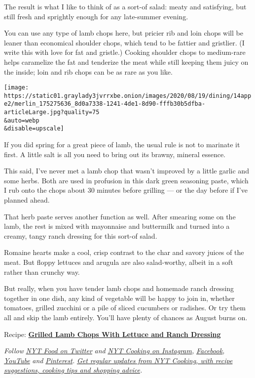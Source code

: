 The result is what I like to think of as a sort-of salad: meaty and
satisfying, but still fresh and sprightly enough for any late-summer
evening.

You can use any type of lamb chops here, but pricier rib and loin chops
will be leaner than economical shoulder chops, which tend to be fattier
and gristlier. (I write this with love for fat and gristle.) Cooking
shoulder chops to medium-rare helps caramelize the fat and tenderize the
meat while still keeping them juicy on the inside; loin and rib chops
can be as rare as you like.

\texttt{[image: https://static01.graylady3jvrrxbe.onion/images/2020/08/19/dining/14appe2/merlin\_175275636\_8d0a7338-1241-4de1-8d90-fffb30b5dfba-articleLarge.jpg?quality=75\\\&auto=webp\\\&disable=upscale]}

If you did spring for a great piece of lamb, the usual rule is not to
marinate it first. A little salt is all you need to bring out its
brawny, mineral essence.

This said, I've never met a lamb chop that wasn't improved by a little
garlic and some herbs. Both are used in profusion in this dark green
seasoning paste, which I rub onto the chops about 30 minutes before
grilling --- or the day before if I've planned ahead.

That herb paste serves another function as well. After smearing some on
the lamb, the rest is mixed with mayonnaise and buttermilk and turned
into a creamy, tangy ranch dressing for this sort-of salad.

Romaine hearts make a cool, crisp contrast to the char and savory juices
of the meat. But floppy lettuces and arugula are also salad-worthy,
albeit in a soft rather than crunchy way.

But really, when you have tender lamb chops and homemade ranch dressing
together in one dish, any kind of vegetable will be happy to join in,
whether tomatoes, grilled zucchini or a pile of sliced cucumbers or
radishes. Or try them all and skip the lamb entirely. You'll have plenty
of chances as August burns on.

Recipe:
\textbf{\href{https://cooking.nytimes3xbfgragh.onion/recipes/1021367-grilled-lamb-chops-with-lettuce-and-ranch-dressing}{Grilled
Lamb Chops With Lettuce and Ranch Dressing}}

\emph{Follow} \href{https://twitter.com/nytfood}{\emph{NYT Food on
Twitter}} \emph{and}
\href{https://www.instagram.com/nytcooking/}{\emph{NYT Cooking on
Instagram}}\emph{,}
\href{https://www.facebookcorewwwi.onion/nytcooking/}{\emph{Facebook}}\emph{,}
\href{https://www.youtube.com/nytcooking}{\emph{YouTube}} \emph{and}
\href{https://www.pinterest.com/nytcooking/}{\emph{Pinterest}}\emph{.}
\href{https://www.nytimes3xbfgragh.onion/newsletters/cooking}{\emph{Get
regular updates from NYT Cooking, with recipe suggestions, cooking tips
and shopping advice}}\emph{.}

